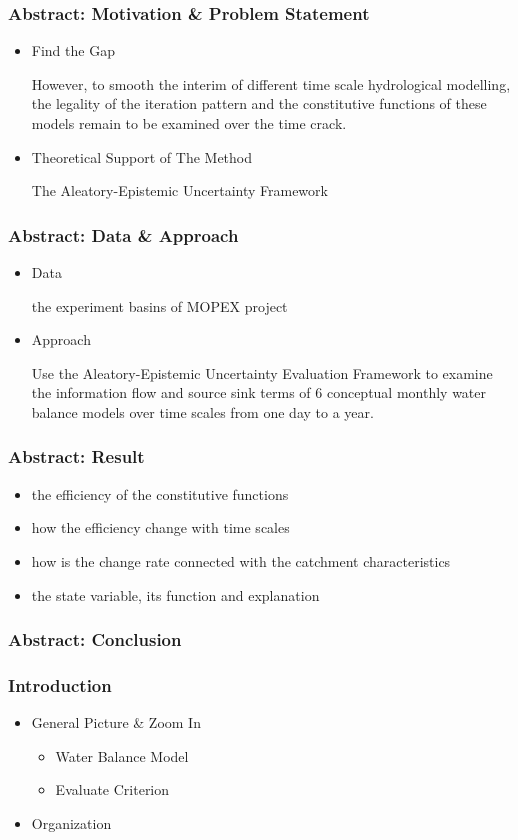 \documentclass{beamer}
\begin{document}
\begin{frame}
\frametitle{Abstract: Motivation \& Problem Statement}
\begin{itemize}
\item Find the Gap

However, to smooth the interim of different time scale hydrological modelling, the legality of the iteration pattern and the constitutive functions of these models remain to be examined over the time crack.

\item Theoretical Support of The Method 
 
The Aleatory-Epistemic Uncertainty Framework 
\end{itemize}

\end{frame}

\begin{frame}
\frametitle{Abstract: Data \& Approach}
\begin{itemize}
\item Data

the experiment basins of MOPEX project
\item Approach 

Use the Aleatory-Epistemic Uncertainty Evaluation Framework to examine the information flow and source sink terms of 6 conceptual monthly water balance models over time scales from one day to a year.
\end{itemize}
\end{frame}

\begin{frame}
\frametitle{Abstract: Result}
\begin{itemize}
\item the efficiency of the constitutive functions
\item how the efficiency change with time scales
\item how is the change rate connected with the catchment characteristics
\item the state variable, its function and explanation
\end{itemize}
\end{frame}
 
\begin{frame}
\frametitle{Abstract: Conclusion}
\end{frame}

 

\begin{frame}
\frametitle{Introduction}
\begin{itemize}
\item General Picture \& Zoom In
\begin{itemize}
\item Water Balance Model
\item Evaluate Criterion
\end{itemize}
\item Organization
\end{itemize}
\end{frame}
\end{document}
